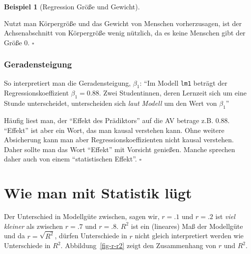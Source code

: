 \documentclass[
  letterpaper,
  oneside,
  open=any]{scrbook}
\theoremstyle{definition}
\theoremstyle{definition}
\newtheorem{example}{Beispiel}[chapter]
\theoremstyle{definition}
\theoremstyle{remark}
\begin{document}
\begin{example}[Regression Größe und
Gewicht]\protect\hypertarget{exm-groesse}{}\label{exm-groesse}

Nutzt man Körpergröße und das Gewicht von Menschen vorherzusagen, ist
der Achsenabschnitt von Körpergröße wenig nützlich, da es keine Menschen
gibt der Größe 0. \(\square\)

\end{example}

\subsubsection{Geradensteigung}\label{geradensteigung}

So interpretiert man die Geradensteigung, \(\beta_1\): \enquote{Im
Modell \texttt{lm1} beträgt der Regressionskoeffizient
\(\beta_1 = 0.88\). Zwei Studentinnen, deren Lernzeit sich um eine
Stunde unterscheidet, unterscheiden sich \emph{laut Modell} um den Wert
von \(\beta_1\)}

\begin{tcolorbox}[enhanced jigsaw, bottomrule=.15mm, left=2mm, colbacktitle=quarto-callout-caution-color!10!white, bottomtitle=1mm, colframe=quarto-callout-caution-color-frame, coltitle=black, rightrule=.15mm, breakable, toptitle=1mm, titlerule=0mm, title=\textcolor{quarto-callout-caution-color}{\faFire}\hspace{0.5em}{Vorsicht}, opacitybacktitle=0.6, arc=.35mm, colback=white, leftrule=.75mm, opacityback=0, toprule=.15mm]

Häufig liest man, der \enquote{Effekt des Prädiktors} auf die AV betrage
z.B. \(0.88\). \enquote{Effekt} ist aber ein Wort, das man kausal
verstehen kann. Ohne weitere Absicherung kann man aber
Regressionskoeffizienten nicht kausal verstehen. Daher sollte man das
Wort \enquote{Effekt} mit Vorsicht genießen. Manche sprechen daher auch
von einem \enquote{statistischen Effekt}. \(\square\)

\end{tcolorbox}

\section{Wie man mit Statistik
lügt}\label{wie-man-mit-statistik-luxfcgt-4}

Der Unterschied in Modellgüte zwischen, sagen wir, \(r=.1\) und \(r=.2\)
ist \emph{viel kleiner} als zwischen \(r=.7\) und \(r=.8\). \(R^2\) ist
ein (lineares) Maß der Modellgüte und da \(r = \sqrt{R^2}\), dürfen
Unterschiede in \(r\) nicht gleich interpretiert werden wie Unterschiede
in \(R^2\). Abbildung~\ref{fig-r-r2} zeigt den Zusammenhang von \(r\)
und \(R^2\).
\end{document}
